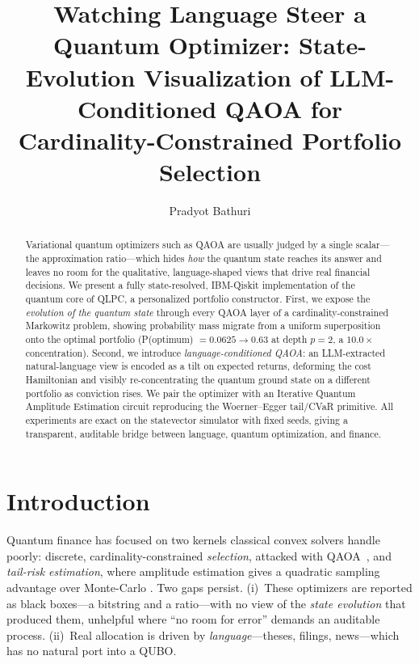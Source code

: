 \documentclass[runningheads]{llncs}
\newcommand{\Popt}{0.63}
\newcommand{\Conc}{10.0}
\newcommand{\Puniform}{0.0625}
\begin{document}
\title{Watching Language Steer a Quantum Optimizer: State-Evolution Visualization of
LLM-Conditioned QAOA for Cardinality-Constrained Portfolio Selection}

\author{Pradyot Bathuri}              %

\maketitle

\begin{abstract}
Variational quantum optimizers such as QAOA are usually judged by a single scalar---the approximation
ratio---which hides \emph{how} the quantum state reaches its answer and leaves no room for the
qualitative, language-shaped views that drive real financial decisions. We present a fully
state-resolved, IBM-Qiskit implementation of the quantum core of QLPC, a personalized portfolio
constructor. First, we expose the \emph{evolution of the quantum state} through every QAOA layer of a
cardinality-constrained Markowitz problem, showing probability mass migrate from a uniform superposition
onto the optimal portfolio (P(optimum) $=\Puniform\to\Popt$ at depth $p{=}2$, a $\Conc\times$
concentration). Second, we introduce \emph{language-conditioned QAOA}: an LLM-extracted natural-language
view is encoded as a tilt on expected returns, deforming the cost Hamiltonian and visibly
re-concentrating the quantum ground state on a different portfolio as conviction rises. We pair the
optimizer with an Iterative Quantum Amplitude Estimation circuit reproducing the Woerner--Egger tail/CVaR
primitive. All experiments are exact on the statevector simulator with fixed seeds, giving a transparent,
auditable bridge between language, quantum optimization, and finance.
\end{abstract}

\section{Introduction}
Quantum finance has focused on two kernels classical convex solvers handle poorly: discrete,
cardinality-constrained \emph{selection}, attacked with QAOA~\cite{farhi2014qaoa}, and \emph{tail-risk
estimation}, where amplitude estimation gives a quadratic sampling advantage over Monte-Carlo
\cite{brassard2002amplitude,woerner2019risk,egger2020finance}. Two gaps persist. (i)~These optimizers are
reported as black boxes---a bitstring and a ratio---with no view of the \emph{state evolution} that
produced them, unhelpful where ``no room for error'' demands an auditable process. (ii)~Real allocation
is driven by \emph{language}---theses, filings, news---which has no natural port into a QUBO.
\end{document}
